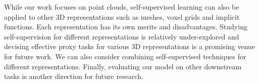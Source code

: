 \documentclass[10pt,twocolumn,letterpaper]{article}
\begin{document}
While our work focuses on point clouds, self-supervised learning can also be applied to other 3D representations such as meshes, voxel grids and implicit functions. Each representation has its own merits and disadvantages. Studying self-supervision for different representations is relatively under-explored and devising effective proxy tasks for various 3D representations is a promising venue for future work.  
We can also consider combining self-supervised techniques for different representations. Finally, evaluating our model on other downstream tasks is another direction for future research.     

{\small


}
\end{document}
